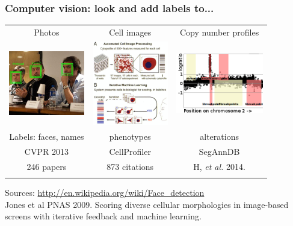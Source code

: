\documentclass{beamer}
\begin{document}
\begin{frame}
  \frametitle{Computer vision: look and add labels to...}
  \begin{tabular}{ccc}
    Photos & Cell images & Copy number profiles \\
    \includegraphics[width=1.3in]{faces} &
    \includegraphics[width=1.3in]{cellprofiler} &
    \includegraphics[width=1.5in]{regions-axes}\\
    Labels: faces, names & phenotypes & alterations \\
    CVPR 2013 & CellProfiler & SegAnnDB \\
    246 papers & 873 citations & H, \textit{et al.} 2014. \\
     &
  \end{tabular}
  Sources: \url{http://en.wikipedia.org/wiki/Face_detection}\\
  Jones et al PNAS 2009. Scoring diverse cellular morphologies in
  image-based screens with iterative feedback and machine learning.
\end{frame}
\end{document}
